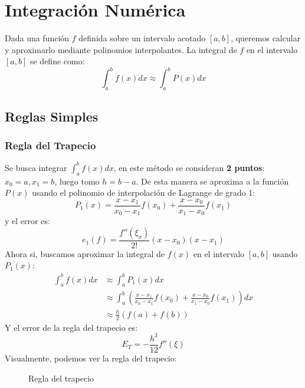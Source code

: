 \documentclass{article}
\begin{document}
\section[Unidad 5 - Integración Numérica]{Integración Numérica}
Dada una función $f$ definida sobre un intervalo acotado $[a,b]$, queremos calcular y aproximarlo mediante polinomios interpolantes. La integral de $f$ en el intervalo $[a,b]$ se define como:
\begin{equation}
    \int_{a}^{b} f(x) dx \approx \int_{a}^{b} P(x) dx
\end{equation}
\subsection{Reglas Simples}
\subsubsection{Regla del Trapecio}
Se busca integrar $\int_{a}^{b} f(x) dx$, en este método se consideran \textbf{2 puntos}: $x_0=a, x_1=b$, luego tomo $h=b-a$. De esta manera se aproxima a la función $P(x)$ usando el polinomio de interpolación de Lagrange de grado 1:
\begin{equation}
    P_1(x) = \frac{x-x_1}{x_0-x_1}f(x_0) + \frac{x-x_0}{x_1-x_0}f(x_1)
\end{equation}
y el error es:
\begin{equation}
    e_1(f) = \frac{f''(\xi_x)}{2!} (x-x_0)(x-x_1)
\end{equation}
Ahora si, buscamos aproximar la integral de $f(x)$ en el intervalo $[a,b]$ usando $P_1(x)$:
\begin{align}
    \int_{a}^{b} f(x) dx &\approx \int_{a}^{b} P_1(x) dx \\
    &\approx \int_{a}^{b} \left( \frac{x-x_1}{x_0-x_1}f(x_0) + \frac{x-x_0}{x_1-x_0}f(x_1) \right) dx \\
    &\approx \frac{h}{2} (f(a) + f(b))
\end{align}
Y el error de la regla del trapecio es:
\begin{equation}
    E_T = -\frac{h^3}{12} f''(\xi)
\end{equation}
Visualmente, podemos ver la regla del trapecio:
\begin{figure}[h]
    \centering
    \caption{Regla del trapecio}
    \label{fig:myplot15}
\end{figure}
\newpage
\end{document}
